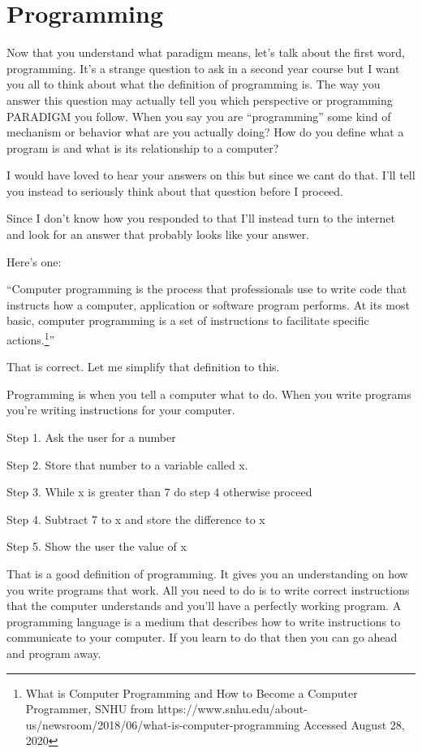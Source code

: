 \section{Programming}\label{programming-paradigms-introduction.md__programming}

Now that you understand what paradigm means, let's talk about the first
word, programming. It's a strange question to ask in a second year
course but I want you all to think about what the definition of
programming is. The way you answer this question may actually tell you
which perspective or programming PARADIGM you follow. When you say you
are ``programming'' some kind of mechanism or behavior what are you
actually doing? How do you define what a program is and what is its
relationship to a computer?

I would have loved to hear your answers on this but since we cant do
that. I'll tell you instead to seriously think about that question
before I proceed.

Since I don't know how you responded to that I'll instead turn to the
internet and look for an answer that probably looks like your answer.

Here's one:

``Computer programming is the process that professionals use to write
code that instructs how a computer, application or software program
performs. At its most basic, computer programming is a set of
instructions to facilitate specific actions.\footnote{What is Computer
  Programming and How to Become a Computer Programmer, SNHU from
  https://www.snhu.edu/about-us/newsroom/2018/06/what-is-computer-programming
  Accessed August 28, 2020}''

That is correct. Let me simplify that definition to this.

Programming is when you tell a computer what to do. When you write
programs you're writing instructions for your computer.

Step 1. Ask the user for a number

Step 2. Store that number to a variable called x.

Step 3. While x is greater than 7 do step 4 otherwise proceed

Step 4. Subtract 7 to x and store the difference to x

Step 5. Show the user the value of x

That is a good definition of programming. It gives you an understanding
on how you write programs that work. All you need to do is to write
correct instructions that the computer understands and you'll have a
perfectly working program. A programming language is a medium that
describes how to write instructions to communicate to your computer. If
you learn to do that then you can go ahead and program away.

